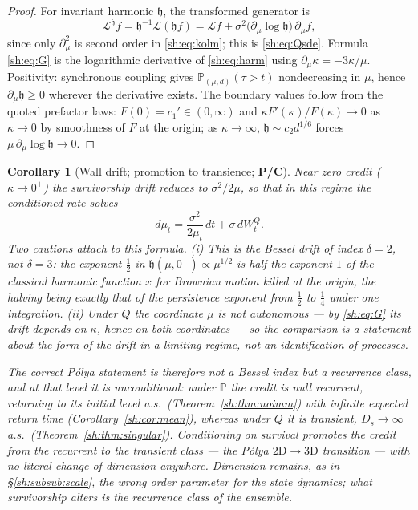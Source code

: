 \documentclass[11pt]{article}
\numberwithin{equation}{section}
\theoremstyle{plain}
\newtheorem{corollary}[theorem]{Corollary}
\theoremstyle{definition}
\theoremstyle{remark}
\newcommand{\PP}{\mathbb{P}}
\newcommand{\Lc}{\mathcal{L}}
\newcommand{\hm}{\mathfrak{h}}
\begin{document}
\begin{proof}
For invariant harmonic $\hm$, the transformed generator is
\[
\Lc^{\hm}f=\hm^{-1}\Lc(\hm f)
=\Lc f+\sigma^2\bigl(\partial_\mu\log\hm\bigr)\,\partial_\mu f,
\]
since only $\partial_\mu^2$ is second order in
\eqref{sh:eq:kolm}; this is \eqref{sh:eq:Qsde}. Formula \eqref{sh:eq:G}
is the logarithmic derivative of \eqref{sh:eq:harm} using
$\partial_\mu\kappa=-3\kappa/\mu$. Positivity: synchronous coupling gives
$\PP_{(\mu,d)}(\tau>t)$ nondecreasing in $\mu$, hence
$\partial_\mu\hm\ge0$ wherever the derivative exists. The boundary values
follow from the quoted prefactor laws: $F(0)=c_1'\in(0,\infty)$ and
$\kappa F'(\kappa)/F(\kappa)\to0$ as $\kappa\to0$ by smoothness of $F$ at
the origin; as $\kappa\to\infty$, $\hm\sim c_2d^{1/6}$ forces
$\mu\,\partial_\mu\log\hm\to0$.
\end{proof}

\begin{corollary}[Wall drift; promotion to transience; \textbf{P/C}]
\label{sh:cor:bessel}
Near zero credit ($\kappa\to0^+$) the survivorship drift reduces to
$\sigma^2/2\mu$, so that in this regime the conditioned rate solves
\[
d\mu_t=\frac{\sigma^2}{2\mu_t}\,dt+\sigma\,dW^Q_t .
\]
Two cautions attach to this formula.
\emph{(i)} This is the Bessel drift of index $\delta=2$, not $\delta=3$:
the exponent $\tfrac12$ in $\hm(\mu,0^+)\propto\mu^{1/2}$ is half the
exponent $1$ of the classical harmonic function $x$ for Brownian motion
killed at the origin, the halving being exactly that of the persistence
exponent from $\tfrac12$ to $\tfrac14$ under one integration.
\emph{(ii)} Under $Q$ the coordinate $\mu$ is not autonomous --- by
\eqref{sh:eq:G} its drift depends on $\kappa$, hence on both coordinates
--- so the comparison is a statement about the \emph{form} of the drift in
a limiting regime, not an identification of processes.

The correct P\'olya statement is therefore not a Bessel index but a
recurrence class, and at that level it is unconditional: under $\PP$ the
credit is null recurrent, returning to its initial level a.s.\
(Theorem~\ref{sh:thm:noimm}) with infinite expected return time
(Corollary~\ref{sh:cor:mean}), whereas under $Q$ it is transient,
$D_s\to\infty$ a.s.\ (Theorem~\ref{sh:thm:singular}). Conditioning on
survival promotes the credit from the recurrent to the transient class ---
the P\'olya $2\mathrm{D}\to3\mathrm{D}$ transition --- with no literal
change of dimension anywhere. Dimension remains, as in
\S\ref{sh:subsub:scale}, the wrong order parameter for the state dynamics;
what survivorship alters is the recurrence class of the \emph{ensemble}.
\end{corollary}
\end{document}
